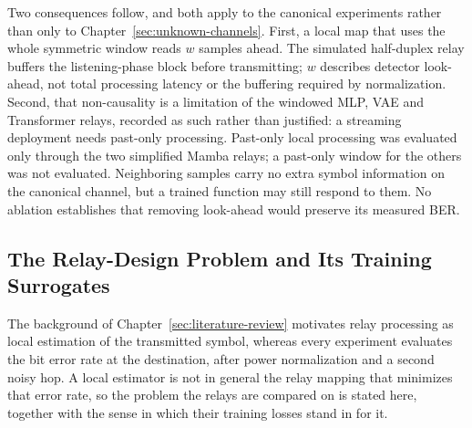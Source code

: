 \begin{remark}
Two consequences follow, and both apply to the canonical experiments rather than only to Chapter~\ref{sec:unknown-channels}. First, a local map that uses the whole symmetric window reads $w$ samples ahead. The simulated half-duplex relay buffers the listening-phase block before transmitting; $w$ describes detector look-ahead, not total processing latency or the buffering required by normalization. Second, that non-causality is a limitation of the windowed MLP, VAE and Transformer relays, recorded as such rather than justified: a streaming deployment needs past-only processing. Past-only local processing was evaluated only through the two simplified Mamba relays; a past-only window for the others was not evaluated. Neighboring samples carry no extra symbol information on the canonical channel, but a trained function may still respond to them. No ablation establishes that removing look-ahead would preserve its measured BER.
\end{remark}

\subsection{The Relay-Design Problem and Its Training Surrogates}\label{sec:relay-design-problem}

The background of Chapter~\ref{sec:literature-review} motivates relay processing as local estimation of the transmitted symbol, whereas every experiment evaluates the bit error rate at the destination, after power normalization and a second noisy hop. A local estimator is not in general the relay mapping that minimizes that error rate, so the problem the relays are compared on is stated here, together with the sense in which their training losses stand in for it.

